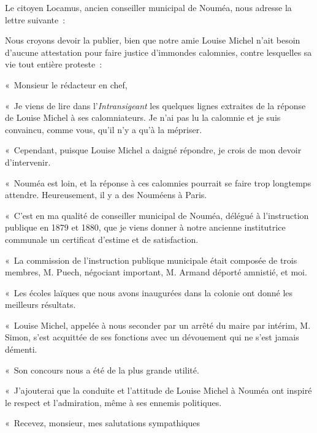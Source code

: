 \documentclass[french,twoside]{book} %
\newcommand{\dateline}[1]{\medskip{\RaggedLeft{#1}\par}\bigskip}
\newcommand{\signed}[1]{\bigbreak\filbreak{\raggedleft #1\par}\medskip}
\newenvironment{quoteblock}%
  {\begin{quoting}}
  {\end{quoting}}
\newenvironment{quotebar}{%
    \def\FrameCommand{{\color{rubric!10!}\vrule width 0.5em} \hspace{0.9em}}%
    \def\OuterFrameSep{\itemsep} %
    \MakeFramed {\advance\hsize-\width \FrameRestore}
  }%
  {%
    \endMakeFramed
  }
\renewenvironment{quoteblock}%
  {%
    \savenotes
    \setstretch{0.9}
    \normalfont
    \begin{quotebar}
  }
  {%
    \end{quotebar}
    \spewnotes
  }
\begin{document}
\begin{quoteblock}
 \noindent Le citoyen Locamus, ancien conseiller municipal de Nouméa, nous adresse la lettre suivante :\par
 Nous croyons devoir la publier, bien que notre amie Louise Michel n’ait besoin d’aucune attestation pour faire justice d’immondes calomnies, contre lesquelles sa vie tout entière proteste :\par
 
\dateline{« Paris, 27 février.}
 \noindent « Monsieur le rédacteur en chef,\par
 « Je viens de lire dans l’\emph{Intransigeant} les quelques lignes extraites de la réponse de Louise Michel à ses calomniateurs. Je n’ai pas lu la calomnie et je suis convaincu, comme vous, qu’il n’y a qu’à la mépriser.\par
 « Cependant, puisque Louise Michel a daigné répondre, je crois de mon devoir d’intervenir.\par
 « Nouméa est loin, et la réponse à ces calomnies pourrait se faire trop longtemps attendre. Heureusement, il y a des Nouméens à Paris.\par
 « C’est en ma qualité de conseiller municipal de Nouméa, délégué à l’instruction publique en 1879 et 1880, que je viens donner à notre ancienne institutrice communale un certificat d’estime et de satisfaction.\par
 « La commission de l’instruction publique municipale était composée de trois membres, M. Puech, négociant important, M. Armand déporté amnistié, et moi.\par
   « Les écoles laïques que nous avons inaugurées dans la colonie ont donné les meilleurs résultats.\par
 « Louise Michel, appelée à nous seconder par un arrêté du maire par intérim, M. Simon, s’est acquittée de ses fonctions avec un dévouement qui ne s’est jamais démenti.\par
 « Son concours nous a été de la plus grande utilité.\par
 « J’ajouterai que la conduite et l’attitude de Louise Michel à Nouméa ont inspiré le respect et l’admiration, même à ses ennemis politiques.\par
 « Recevez, monsieur, mes salutations sympathiques\par
 

\signed{« P. L{\scshape ocamus}. »}
 \end{quoteblock}
\end{document}
